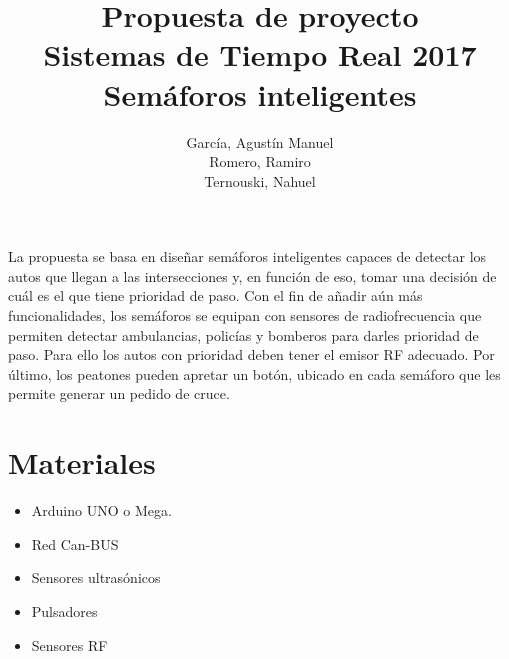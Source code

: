 \documentclass[a4paper,11pt]{article}
\title{Propuesta de proyecto
		\\Sistemas de Tiempo Real 2017
		\\{\Large Semáforos inteligentes}
}
\author{García, Agustín Manuel
\\Romero, Ramiro
\\Ternouski, Nahuel}
\date{}
\begin{document}
\maketitle

La propuesta se basa en diseñar semáforos inteligentes capaces de detectar los autos que llegan a las intersecciones y, en función de eso, tomar una decisión de cuál es el que tiene prioridad de paso. Con el fin de añadir aún más funcionalidades, los semáforos se equipan con sensores de radiofrecuencia que permiten detectar ambulancias,  policías y bomberos para darles prioridad de paso. Para ello los autos con prioridad deben tener el emisor RF adecuado. Por último, los peatones pueden apretar un botón, ubicado en cada semáforo que les permite generar un pedido de cruce.

\section*{Materiales}
\begin{itemize}
	\item Arduino UNO o Mega.
	\item Red Can-BUS
	\item Sensores ultrasónicos
	\item Pulsadores
	\item Sensores RF
\end{itemize}
\end{document}
